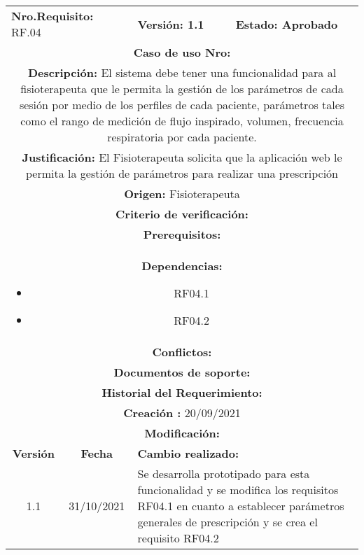 \begin{center}
        
        \begin{tabular}{|c|c|p{4cm}|p{4cm}|}
            \hline
            \rowcolor{red} \multicolumn{4}{|c|}{\textbf{Prioridad:} Alta}  \\
            \hline
            \multicolumn{2}{|l}{\textbf{Nro.Requisito: }RF.04} & \multicolumn{1}{l|}{\textbf{Versión: 1.1 }} & \multicolumn{1}{|l|}{\textbf{Estado: Aprobado}}  \\
            \multicolumn{4}{|p{12cm}|}{\textbf{Caso de uso Nro: }}  \\
            \hline
            \multicolumn{4}{|p{13cm}|}{\textbf{Descripción: }El sistema debe tener una funcionalidad para al fisioterapeuta que le permita la gestión de los parámetros de cada sesión por medio de los perfiles de cada paciente, parámetros tales como el rango de medición de flujo inspirado, volumen, frecuencia respiratoria por cada paciente.}  \\
            \multicolumn{4}{|p{13cm}|}{\textbf{Justificación: }El Fisioterapeuta solicita que la aplicación web le permita la gestión de parámetros para realizar una prescripción}  \\
            \multicolumn{4}{|p{12cm}|}{\textbf{Origen: }Fisioterapeuta}  \\
            \multicolumn{4}{|p{13cm}|}{\textbf{Criterio de verificación: }}  \\
            \hline
            \multicolumn{4}{|p{13cm}|}{\textbf{Prerequisitos: }}  \\
            \hline \multicolumn{4}{|p{12cm}|}{\textbf{Dependencias: }
                \begin{itemize}
                \item RF04.1
                \item RF04.2
                \end{itemize}}  \\
            \multicolumn{4}{|p{12cm}|}{\textbf{Conflictos: }}  \\
            \hline
            \multicolumn{4}{|p{12cm}|}{\textbf{Documentos de soporte: }}  \\
            \hline
            \multicolumn{4}{|p{12cm}|}{\textbf{Historial del Requerimiento: }}  \\
            \multicolumn{4}{|p{12cm}|}{\textbf{Creación : }20/09/2021}  \\
            \multicolumn{4}{|p{12cm}|}{\textbf{Modificación: }}  \\
             \textbf{Versión} & \textbf{Fecha} & \multicolumn{2}{p{8cm}|}{\textbf{Cambio realizado:}} \\
            \hline
               1.1    &31/10/2021 &   \multicolumn{2}{p{8cm}|}{Se desarrolla prototipado para esta funcionalidad y se modifica los requisitos RF04.1 en cuanto a establecer parámetros generales de prescripción y se crea el requisito RF04.2}
              \\
            \hline
        \end{tabular}
        

\end{center}
